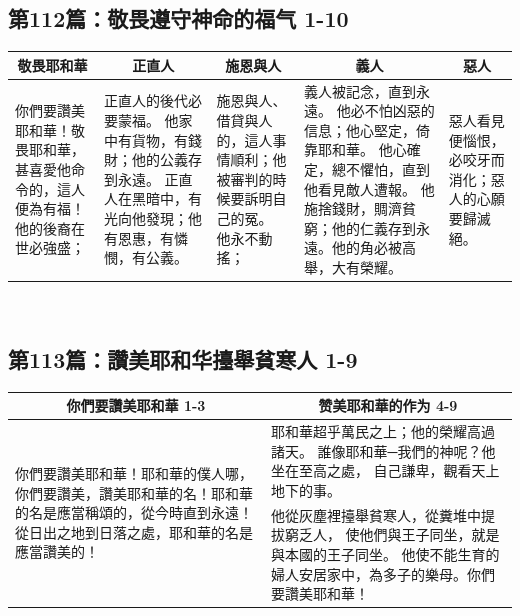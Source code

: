 \subsection{第112篇：敬畏遵守神命的福气 1-10}

\begin{table}[H]
\centering
\begin{tabular}{p{2.75cm}|p{3.500cm}|p{3.00cm}|p{5.00cm}|p{1.75cm}}\hline\hline
\multicolumn{1}{c|}{敬畏耶和華}&\multicolumn{1}{c|}{正直人}&\multicolumn{1}{c|}{施恩與人}&\multicolumn{1}{c|}{義人}&\multicolumn{1}{c}{惡人}\\\hline
你們要讚美耶和華！敬畏耶和華，甚喜愛他命令的，這人便為有福！
他的後裔在世必強盛；
&正直人的後代必要蒙福。
他家中有貨物，有錢財；他的公義存到永遠。
正直人在黑暗中，有光向他發現；他有恩惠，有憐憫，有公義。
&施恩與人、借貸與人的，這人事情順利；他被審判的時候要訴明自己的冤。
他永不動搖；
&義人被記念，直到永遠。
他必不怕凶惡的信息；他心堅定，倚靠耶和華。
他心確定，總不懼怕，直到他看見敵人遭報。
他施捨錢財，賙濟貧窮；他的仁義存到永遠。他的角必被高舉，大有榮耀。
&惡人看見便惱恨，必咬牙而消化；惡人的心願要歸滅絕。\\\hline
\end{tabular}
\end{table} 











\subsection{第113篇：讚美耶和华擡舉貧寒人 1-9}
\begin{table}[H]
\centering
\begin{tabular}{p{5.75cm}|p{11.00cm}}\hline\hline
\multicolumn{1}{c|}{你們要讚美耶和華 1-3}&\multicolumn{1}{c}{赞美耶和華的作为 4-9}\\\hline
\multirow{2}{5.9cm}{你們要讚美耶和華！耶和華的僕人哪，你們要讚美，讚美耶和華的名！耶和華的名是應當稱頌的，從今時直到永遠！
從日出之地到日落之處，耶和華的名是應當讚美的！}
&耶和華超乎萬民之上；他的榮耀高過諸天。
誰像耶和華─我們的神呢？他坐在至高之處，
自己謙卑，觀看天上地下的事。\\\cline{2-2}
&他從灰塵裡擡舉貧寒人，從糞堆中提拔窮乏人，
使他們與王子同坐，就是與本國的王子同坐。
他使不能生育的婦人安居家中，為多子的樂母。你們要讚美耶和華！\\\hline
\end{tabular}
\end{table} 








